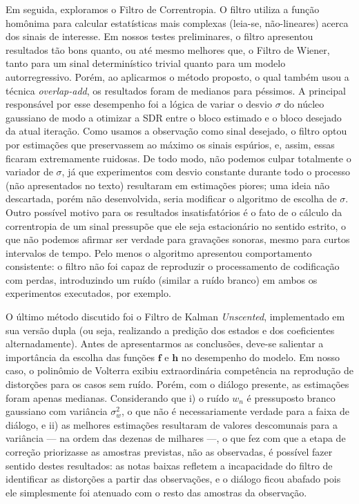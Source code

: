 Em seguida, exploramos o Filtro de Correntropia. O filtro utiliza a função homônima
para calcular estatísticas mais complexas (leia-se, não-lineares) acerca dos sinais de
interesse. Em nossos testes preliminares, o filtro apresentou resultados tão bons
quanto, ou até mesmo melhores que, o Filtro de Wiener, tanto para um sinal
determinístico trivial quanto para um modelo autorregressivo. Porém, ao aplicarmos o
método proposto, o qual também usou a técnica \textit{overlap-add}, os resultados foram
de medianos para péssimos. A principal responsável por esse desempenho foi a lógica de
variar o desvio $\sigma$ do núcleo gaussiano de modo a otimizar a SDR entre o bloco
estimado e o bloco desejado da atual iteração. Como usamos a observação como sinal
desejado, o filtro optou por estimações que preservassem ao máximo os sinais espúrios,
e, assim, essas ficaram extremamente ruidosas. De todo modo, não podemos culpar
totalmente o variador de $\sigma$, já que experimentos com desvio constante durante
todo o processo (não apresentados no texto) resultaram em estimações piores; uma ideia
não descartada, porém não desenvolvida, seria modificar o algoritmo de escolha de
$\sigma$. Outro possível motivo para os resultados insatisfatórios é o fato de o
cálculo da correntropia de um sinal pressupõe que ele seja estacionário no sentido
estrito, o que não podemos afirmar ser verdade para gravações sonoras, mesmo para
curtos intervalos de tempo. Pelo menos o algoritmo apresentou comportamento
consistente: o filtro não foi capaz de reproduzir o processamento de codificação com
perdas, introduzindo um ruído (similar a ruído branco) em ambos os experimentos
executados, por exemplo.

O último método discutido foi o Filtro de Kalman \textit{Unscented}, implementado em
sua versão dupla (ou seja, realizando a predição dos estados e dos coeficientes
alternadamente). Antes de apresentarmos as conclusões, deve-se salientar a importância
da escolha das funções $\mathbf{f}$ e $\mathbf{h}$ no desempenho do modelo. Em nosso
caso, o polinômio de Volterra exibiu extraordinária competência na reprodução de
distorções para os casos sem ruído. Porém, com o diálogo presente, as estimações foram
apenas medianas. Considerando que i) o ruído $w_n$ é pressuposto branco gaussiano com
variância $\sigma_{w}^2$, o que não é necessariamente verdade para a faixa de diálogo,
e ii) as melhores estimações resultaram de valores descomunais para a variância --- na
ordem das dezenas de milhares ---, o que fez com que a etapa de correção priorizasse as
amostras previstas, não as observadas, é possível fazer sentido destes resultados: as
notas baixas refletem a incapacidade do filtro de identificar as distorções a partir
das observações, e o diálogo ficou abafado pois ele simplesmente foi atenuado com o
resto das amostras da observação.

